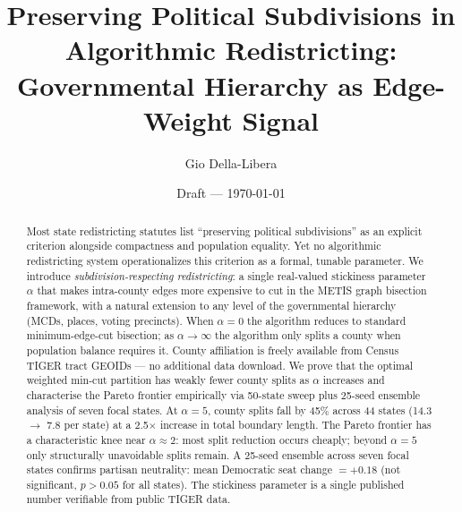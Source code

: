 \documentclass[12pt]{article}
\title{Preserving Political Subdivisions in Algorithmic Redistricting:\\
       Governmental Hierarchy as Edge-Weight Signal}
\author{Gio Della-Libera}
\date{Draft --- \today}
\begin{document}
\maketitle

\begin{abstract}
Most state redistricting statutes list ``preserving political subdivisions''
as an explicit criterion alongside compactness and population equality.
Yet no algorithmic redistricting system operationalizes this criterion
as a formal, tunable parameter.
We introduce \emph{subdivision-respecting redistricting}: a single real-valued
stickiness parameter $\alpha$ that makes intra-county edges more expensive
to cut in the METIS graph bisection framework, with a natural extension to
any level of the governmental hierarchy (MCDs, places, voting precincts).
When $\alpha = 0$ the algorithm reduces to standard minimum-edge-cut bisection;
as $\alpha \to \infty$ the algorithm only splits a county when population
balance requires it.
County affiliation is freely available from Census TIGER tract GEOIDs ---
no additional data download.
We prove that the optimal weighted min-cut partition has weakly fewer county
splits as $\alpha$ increases and characterise the Pareto frontier empirically
via 50-state sweep plus 25-seed ensemble analysis of seven focal states.
At $\alpha = 5$, county splits fall by 45\% across 44 states (14.3 $\to$ 7.8 per state)
at a 2.5$\times$ increase in total boundary length.
The Pareto frontier has a characteristic knee near $\alpha \approx 2$: most
split reduction occurs cheaply; beyond $\alpha = 5$ only structurally unavoidable
splits remain.
A 25-seed ensemble across seven focal states confirms partisan neutrality:
mean Democratic seat change $= +0.18$ (not significant, $p > 0.05$ for all states).
The stickiness parameter is a single published number verifiable from public TIGER data.
\end{abstract}










\end{document}
